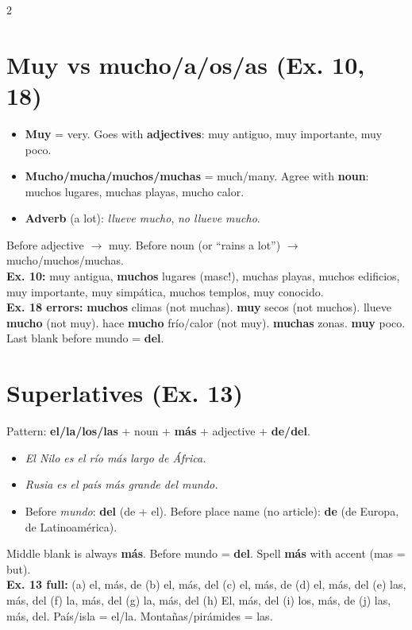 \documentclass[9pt,a4paper]{article}
\begin{document}
\begin{multicols}{2}
\section*{\color{spanishgreen}Muy vs mucho/a/os/as (Ex. 10, 18)}
\begin{itemize}
\item \textbf{Muy} = very. Goes with \textbf{adjectives}: muy antiguo, muy importante, muy poco.
\item \textbf{Mucho/mucha/muchos/muchas} = much/many. Agree with \textbf{noun}: muchos lugares, muchas playas, mucho calor.
\item \textbf{Adverb} (a lot): \textit{llueve mucho}, \textit{no llueve mucho}.
\end{itemize}
Before adjective $\to$ muy. Before noun (or ``rains a lot'') $\to$ mucho/muchos/muchas. \\
\textbf{Ex. 10:} muy antigua, \textbf{muchos} lugares (masc!), muchas playas, muchos edificios, muy importante, muy simp\'atica, muchos templos, muy conocido. \\
\textbf{Ex. 18 errors:} \textbf{muchos} climas (not muchas). \textbf{muy} secos (not muchos). llueve \textbf{mucho} (not muy). hace \textbf{mucho} fr\'io/calor (not muy). \textbf{muchas} zonas. \textbf{muy} poco. Last blank before mundo = \textbf{del}.

\section*{\color{spanishgreen}Superlatives (Ex. 13)}
Pattern: \textbf{el/la/los/las} + noun + \textbf{m\'as} + adjective + \textbf{de/del}.
\begin{itemize}
\item \textit{El Nilo es el r\'io m\'as largo de \'Africa.}
\item \textit{Rusia es el pa\'is m\'as grande del mundo.}
\item Before \textit{mundo}: \textbf{del} (de + el). Before place name (no article): \textbf{de} (de Europa, de Latinoam\'erica).
\end{itemize}
Middle blank is always \textbf{m\'as}. Before mundo = \textbf{del}. Spell \textbf{m\'as} with accent (mas = but). \\
\textbf{Ex. 13 full:} (a) el, m\'as, de (b) el, m\'as, del (c) el, m\'as, de (d) el, m\'as, del (e) las, m\'as, del (f) la, m\'as, del (g) la, m\'as, del (h) El, m\'as, del (i) los, m\'as, de (j) las, m\'as, del. Pa\'is/isla = el/la. Monta\~nas/pir\'amides = las.


\end{multicols}
\end{document}
